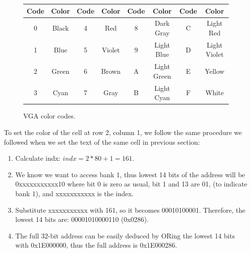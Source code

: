 \documentclass[oneside]{book}
\begin{document}
\begin{figure}[H]
\begin{center}
\begin{tabular}{|c|c|c|c|c|c|c|c|}

\hline \textbf{Code} & \textbf{Color} &
       \textbf{Code} & \textbf{Color} &
       \textbf{Code} & \textbf{Color} &
       \textbf{Code} & \textbf{Color} \\


\hline 0 & \cellcolor{black}\color{white} Black        & 
       4 & \cellcolor{red}\color{white}   Red          & 
       8 & \cellcolor{darkgray}\color{white} Dark Gray    & 
       C & \cellcolor{red!60}\color{white} Light Red    \\
\hline 1 & \cellcolor{blue}\color{white} Blue         & 
       5 & \cellcolor{violet}\color{white} Violet       & 
       9 & \cellcolor{blue!60}\color{white} Light Blue   & 
       D & \cellcolor{violet!60}\color{white} Light Violet \\
\hline 2 & \cellcolor{green}\color{white} Green        & 
       6 & \cellcolor{brown}\color{white} Brown        & 
       A & \cellcolor{green!60}\color{black} Light Green  & 
       E & \cellcolor{yellow}\color{black} Yellow       \\
\hline 3 & \cellcolor{cyan}\color{white} Cyan         & 
       7 & \cellcolor{gray}\color{white} Gray         & 
       B & \cellcolor{cyan!60}\color{black} Light Cyan   & 
       F & \cellcolor{white}\color{black} White        \\

\hline

\end{tabular}
\end{center}
\caption{VGA color codes.}
\label{colormap}
\end{figure}

To set the color of the cell at row 2, column 1, we follow the same procedure
we followed when we set the text of the same cell in previous section:

\begin{enumerate}

\item Calculate indx: $indx=2*80+1=161$.
\item We know we want to access bank 1, thus lowest 14 bits of the address
      will be 0xxxxxxxxxxx10 where bit 0 is zero as usual, bit 1 and 13 are 01,
      (to indicate bank 1), and xxxxxxxxxxx is the index.
\item Substitute xxxxxxxxxxx with 161, so it becomes 00010100001. Therefore,
      the lowest 14 bits are: 00001010000110 (0x0286).
\item The full 32-bit address can be easily deduced by ORing the lowest 14 bits
      with 0x1E000000, thus the full address is 0x1E000286.

\end{enumerate}
\end{document}
